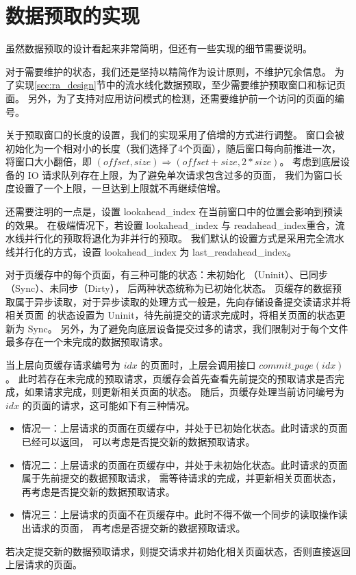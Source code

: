 \section{数据预取的实现}
虽然数据预取的设计看起来非常简明，但还有一些实现的细节需要说明。

对于需要维护的状态，我们还是坚持以精简作为设计原则，不维护冗余信息。
为了实现\ref{sec:ra_design}节中的流水线化数据预取，至少需要维护预取窗口和标记页面。
另外，为了支持对应用访问模式的检测，还需要维护前一个访问的页面的编号。

关于预取窗口的长度的设置，我们的实现采用了倍增的方式进行调整。
窗口会被初始化为一个相对小的长度（我们选择了4个页面），随后窗口每向前推进一次，
将窗口大小翻倍，即 $ (offset, size) \Rightarrow (offset + size, 2*size) $。
考虑到底层设备的 IO 请求队列存在上限，为了避免单次请求包含过多的页面，
我们为窗口长度设置了一个上限，一旦达到上限就不再继续倍增。

还需要注明的一点是，设置 lookahead\_index 在当前窗口中的位置会影响到预读的效果。
在极端情况下，若设置 lookahead\_index 与 readahead\_index重合，流水线并行化的预取将退化为非并行的预取。
我们默认的设置方式是采用完全流水线并行化的方式，设置 lookahead\_index 为 last\_readahead\_index。

对于页缓存中的每个页面，有三种可能的状态：未初始化 （Uninit）、已同步 （Sync）、未同步（Dirty），
后两种状态统称为已初始化状态。
页缓存的数据预取属于异步读取，对于异步读取的处理方式一般是，先向存储设备提交读请求并将相关页面
的状态设置为 Uninit，待先前提交的请求完成时，将相关页面的状态更新为 Sync。
另外，为了避免向底层设备提交过多的请求，我们限制对于每个文件最多存在一个未完成的数据预取请求。

当上层向页缓存请求编号为 $ idx $ 的页面时，上层会调用接口  $ commit\_page(idx) $。
此时若存在未完成的预取请求，页缓存会首先查看先前提交的预取请求是否完成，如果请求完成，则更新相关页面的状态。
随后，页缓存处理当前访问编号为 $ idx $ 的页面的请求，这可能如下有三种情况。
\begin{itemize}
    \item 情况一：上层请求的页面在页缓存中，并处于已初始化状态。此时请求的页面已经可以返回，
    可以考虑是否提交新的数据预取请求。
    \item 情况二：上层请求的页面在页缓存中，并处于未初始化状态。此时请求的页面属于先前提交的数据预取请求，
    需等待请求的完成，并更新相关页面状态，再考虑是否提交新的数据预取请求。
    \item 情况三：上层请求的页面不在页缓存中。此时不得不做一个同步的读取操作读出请求的页面，
    再考虑是否提交新的数据预取请求。
\end{itemize}
若决定提交新的数据预取请求，则提交请求并初始化相关页面状态，否则直接返回上层请求的页面。

